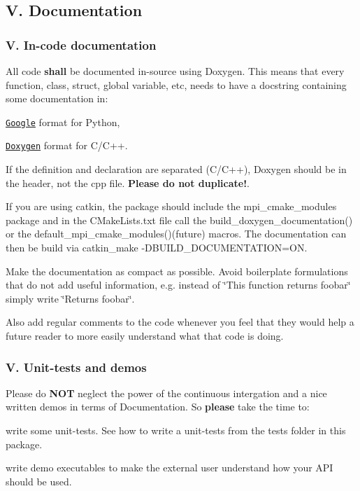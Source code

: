 \subsection*{V. Documentation}

\subsubsection*{V. In-\/code documentation}

All code {\bfseries shall} be documented in-\/source using Doxygen. This means that every function, class, struct, global variable, etc, needs to have a docstring containing some documentation in\+:
\begin{DoxyItemize}
\item \href{https://google.github.io/styleguide/pyguide.html?showone=Comments#Comments}{\tt Google} format for Python,
\item \href{http://www.doxygen.nl/manual/index.html}{\tt Doxygen} format for C/\+C++.
\end{DoxyItemize}

If the definition and declaration are separated (C/\+C++), Doxygen should be in the header, not the cpp file. {\bfseries Please do not duplicate!}.

If you are using catkin, the package should include the mpi\+\_\+cmake\+\_\+modules package and in the C\+Make\+Lists.\+txt file call the {\ttfamily build\+\_\+doxygen\+\_\+documentation()} or the {\ttfamily default\+\_\+mpi\+\_\+cmake\+\_\+modules()}(future) macros. The documentation can then be build via catkin\+\_\+make -\/\+D\+B\+U\+I\+L\+D\+\_\+\+D\+O\+C\+U\+M\+E\+N\+T\+A\+T\+I\+ON=ON.

Make the documentation as compact as possible. Avoid boilerplate formulations that do not add useful information, e.\+g. instead of \char`\"{}\+This function returns foobar\char`\"{} simply write \char`\"{}\+Returns foobar\char`\"{}.

Also add regular comments to the code whenever you feel that they would help a future reader to more easily understand what that code is doing.

\subsubsection*{V. Unit-\/tests and demos}

Please do {\bfseries N\+OT} neglect the power of the continuous intergation and a nice written demos in terms of Documentation. So {\bfseries please} take the time to\+:
\begin{DoxyItemize}
\item write some unit-\/tests. See how to write a unit-\/tests from the tests folder in this package.
\item write demo executables to make the external user understand how your A\+PI should be used. 
\end{DoxyItemize}